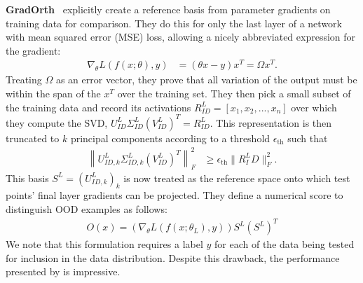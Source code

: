 \textbf{GradOrth}~\citet{behpour2023} explicitly create a reference basis from parameter gradients on training data for comparison. They do this for only the last layer of a network with mean squared error (MSE) loss, allowing a nicely abbreviated expression for the gradient:
\begin{align}
    \nabla_\theta L(f(x; \theta), y) &= (\theta x - y)x^T = \Omega x^T.
\end{align}
Treating $\Omega$ as an error vector, they prove that all variation of the output must be within the span of the $x^T$ over the training set. They then pick a small subset of the training data and record its activations $R^L_{ID} = [x_1, x_2, ..., x_n]$ over which they compute the SVD, $U^L_{ID} \Sigma^L_{ID} (V^L_{ID})^T = R^L_{ID}$. This representation is then truncated to $k$ principal components according to a threshold $\epsilon_{\text{th}}$ such that 
\begin{align}
\left\| U^L_{ID, k} \Sigma^L_{ID, k} (V^L_{ID})^T\right\|^2_F &\geq \epsilon_\text{th} \|R^L_ID\|^2_F.
\end{align}
This basis $S^L = (U^L_{ID, k})_k$ is now treated as the reference
space onto which test points' final layer gradients can be
projected. They define a numerical score to distinguish OOD examples
as follows: 
\begin{align}
    O(x) = (\nabla_{\theta} L(f(x; \theta_L), y))S^L(S^L)^T
\end{align}
We note that this formulation requires a label $y$ for each of the data being tested for inclusion in the data distribution. 
Despite this drawback, the performance presented by \citet{behpour2023} is impressive.

